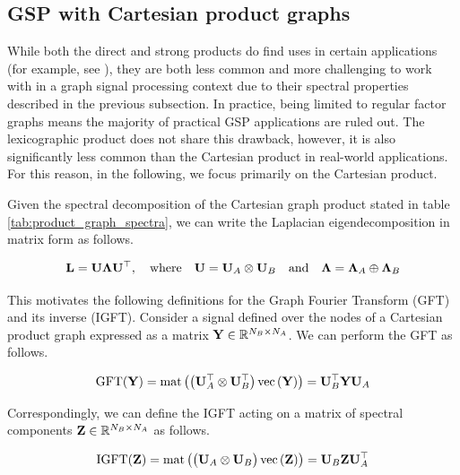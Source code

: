 \subsection{GSP with Cartesian product graphs}

\label{sec:gsp_cpg}

While both the direct and strong products do find uses in certain applications (for example, see \citep{Kaveh2011}), they are both less common and more challenging to work with in a graph signal processing context due to their spectral properties described in the previous subsection. In practice, being limited to regular factor graphs means the majority of practical GSP applications are ruled out. The lexicographic product does not share this drawback, however, it is also significantly less common than the Cartesian product in real-world applications. For this reason, in the following, we focus primarily on the Cartesian product.

Given the spectral decomposition of the Cartesian graph product stated in table \ref{tab:product_graph_spectra}, we can write the Laplacian eigendecomposition in matrix form as follows.

\begin{equation}
    \mathbf{L} = \mathbf{U} \mathbf{\Lambda} \mathbf{U}^\top, \quad \text{where} \quad \mathbf{U} = \mathbf{U}_A \otimes \mathbf{U}_B \quad \text{and} \quad \mathbf{\Lambda} = \mathbf{\Lambda}_A \oplus \mathbf{\Lambda}_B
\end{equation}

This motivates the following definitions for the Graph Fourier Transform (GFT) and its inverse (IGFT). Consider a signal defined over the nodes of a Cartesian product graph expressed as a matrix $\mathbf{Y} \in \mathbb{R}^{N_B \times N_A}$. We can perform the GFT as follows.


\begin{equation}
    \label{eq:GFT_2d}
    \text{GFT}(\mathbf{Y}) = \text{\textup{mat}}\left(\big( \mathbf{U}_A^\top \otimes \mathbf{U}_B^\top \big) \, \text{\textup{vec}}\left(\mathbf{Y}\right)\right) = \mathbf{U}_B^\top \mathbf{Y} \mathbf{U}_A
\end{equation}

Correspondingly, we can define the IGFT acting on a matrix of spectral components $\mathbf{Z} \in \mathbb{R}^{N_B \times N_A}$ as follows.

\begin{equation}
    \label{eq:IGFT_2d}
    \text{IGFT}(\mathbf{Z}) = \text{\textup{mat}}\left(\big( \mathbf{U}_A \otimes \mathbf{U}_B \big)\,\text{\textup{vec}}\left(\mathbf{Z}\right)\right) = \mathbf{U}_B \mathbf{Z} \mathbf{U}_A^\top
\end{equation}


